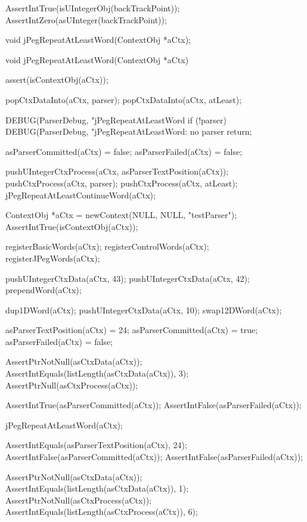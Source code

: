   AssertIntTrue(isUIntegerObj(backTrackPoint));
  AssertIntZero(asUInteger(backTrackPoint));
\stopCTest
\stopTestCase
\stopTestSuite

\startTestSuite[jPegRepeatAtLeastWord]

\startCHeader
void jPegRepeatAtLeastWord(ContextObj *aCtx);
\stopCHeader

\startCCode
void jPegRepeatAtLeastWord(ContextObj *aCtx) {
  assert(isContextObj(aCtx));
  
  popCtxDataInto(aCtx, parser);
  popCtxDataInto(aCtx, atLeast);
  
  DEBUG(ParserDebug, "jPegRepeatAtLeastWord%
  if (!parser) {
    DEBUG(ParserDebug, "jPegRepeatAtLeastWord: no parser%
    return;
  }
  
  asParserCommitted(aCtx) = false;
  asParserFailed(aCtx)    = false;
  
  pushUIntegerCtxProcess(aCtx, asParserTextPosition(aCtx));
  pushCtxProcess(aCtx, parser);
  pushCtxProcess(aCtx, atLeast);
  jPegRepeatAtLeastContinueWord(aCtx);
}
\stopCCode

\startCTest
  ContextObj *aCtx = newContext(NULL, NULL, "testParser");
  AssertIntTrue(isContextObj(aCtx));
  
  registerBasicWords(aCtx);
  registerControlWords(aCtx);
  registerJPegWords(aCtx);
  
  pushUIntegerCtxData(aCtx, 43);
  pushUIntegerCtxData(aCtx, 42);
  prependWord(aCtx);
  
  dup1DWord(aCtx);
  pushUIntegerCtxData(aCtx, 10);
  swap12DWord(aCtx);
  
  asParserTextPosition(aCtx) = 24;
  asParserCommitted(aCtx)    = true;
  asParserFailed(aCtx)       = false;
  
  AssertPtrNotNull(asCtxData(aCtx));
  AssertIntEquals(listLength(asCtxData(aCtx)), 3);
  AssertPtrNull(asCtxProcess(aCtx));
  
  AssertIntTrue(asParserCommitted(aCtx));
  AssertIntFalse(asParserFailed(aCtx));
  
  jPegRepeatAtLeastWord(aCtx);
  
  AssertIntEquals(asParserTextPosition(aCtx), 24);
  AssertIntFalse(asParserCommitted(aCtx));
  AssertIntFalse(asParserFailed(aCtx));
  
  AssertPtrNotNull(asCtxData(aCtx));
  AssertIntEquals(listLength(asCtxData(aCtx)), 1);
  AssertPtrNotNull(asCtxProcess(aCtx));
  AssertIntEquals(listLength(asCtxProcess(aCtx)), 6);
  
